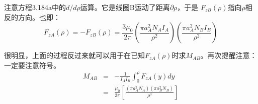 注意方程3.184a中的$d/d\rho$运算。它是线圈B运动了距离$\partial\rho$，于是
$F_{zB}(\rho)$指向$\rho$相反的方向。也即：
\begin{equation}%
F_{zA}(\rho)=-F_{zB}(\rho)
=\frac{3\mu_0}{2\pi}\left(\frac{\pi a_{A}^{2}N_A I_A}{\rho^2}\right)\left(\frac{\pi a_{A}^{2}N_B I_B}{\rho^2}\right)
\end{equation}

很明显，上面的过程反过来就可以用于在已知$F_{zA}(\rho)$时求$M_{AB}$。再次提醒注意：一定要注意符号。
\begin{eqnarray}%
M_{AB}&=&-\frac{1}{I_AI_B}\int_{0}^{\rho}F_{zA}(y)dy\\
&=&\frac{\mu_0}{2\pi}\left[\frac{(\pi a_{A}^{2}N_A)(\pi a_{B}^{2}N_B)}{\rho^3}\right]
\end{eqnarray}